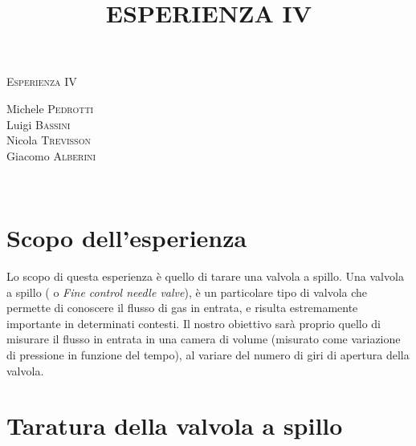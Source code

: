 \documentclass[a4paper,11pt]{article}
\begin{document}
\begin{center}



\textsc{\Huge Esperienza IV}\\[0.5cm]



\large
\title{ESPERIENZA IV}

Michele \textsc{Pedrotti}\\
Luigi \textsc{Bassini}\\
Nicola \textsc{Trevisson}\\
Giacomo \textsc{Alberini}






\end{center}


~\\
\section{Scopo dell'esperienza}
Lo scopo di questa esperienza è quello di tarare una valvola a spillo. Una valvola a spillo ( o \textit{Fine control needle valve}), è un particolare tipo di valvola che permette di conoscere il flusso di gas in entrata, e risulta estremamente importante in determinati contesti. Il nostro obiettivo sarà proprio quello di misurare il flusso in entrata in una camera di volume (misurato come variazione di pressione in funzione del tempo), al variare del numero di giri di apertura della valvola.


\section{Taratura della valvola a spillo}
\end{document}

